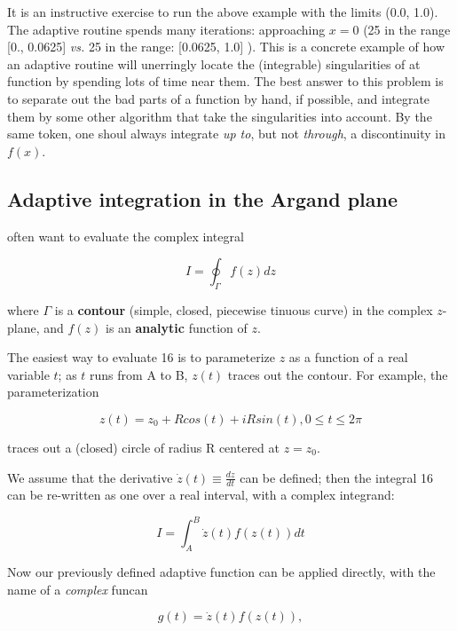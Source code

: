 It is an instructive exercise to run the above example with the limits (0.0, 1.0). The adaptive routine spends many iterations: approaching $x = 0$ (25 in the range [0., 0.0625] \textit{vs.} 25 in the range: [0.0625, 1.0] ). This is a concrete example of how an adaptive routine will unerringly locate the (integrable) singularities of at function by spending lots of time near them. The best answer to this problem is to separate out the bad parts of a function by hand, if possible, and integrate them by some other algorithm that take the singularities into account. By the same token, one shoul always integrate \textit{up to}, but not \textit{through}, a discontinuity in $f(x)$.

\subsection{Adaptive integration in the Argand plane}
 often want to evaluate the complex integral

\begin{equation}
I = \oint_{\Gamma}f(z)dz
\end{equation}

where $\Gamma$ is a \textbf{contour} (simple, closed, piecewise tinuous curve) in the complex $z$-plane, and $f(z)$ is an \textbf{analytic} function of $z$.

The easiest way to evaluate 16 is to parameterize $z$ as a function of a real variable $t$; as $t$ runs from A to B, $z(t)$ traces out the contour. For example, the parameterization

\begin{equation}
z(t) = z_0 + R cos(t) + iR sin(t) , 0 \leq t \leq 2\pi
\end{equation}

traces out a (closed) circle of radius R centered at $z = z_0$.

We assume that the derivative $\dot{z}(t)\equiv \frac{dz}{dt}$ can be defined; then the integral 16 can be re-written as one over a real interval, with a complex integrand:

\begin{equation}
I = \int_{A}^{B} \dot{z}(t)f\left( z(t) \right) dt
\end{equation}

Now our previously defined adaptive function  can be applied directly, with  the name of a \textit{complex} funcan

\begin{equation}
g(t) = \dot{z}(t)f\left( z(t) \right),
\end{equation}

